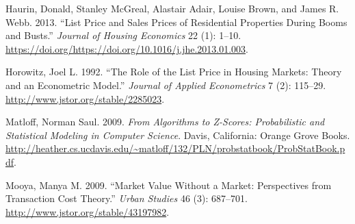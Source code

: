 \documentclass{article}
\begin{document}
\leavevmode\hypertarget{ref-haurin}{}%
Haurin, Donald, Stanley McGreal, Alastair Adair, Louise Brown, and James
R. Webb. 2013. ``List Price and Sales Prices of Residential Properties
During Booms and Busts.'' \emph{Journal of Housing Economics} 22 (1):
1--10. \url{https://doi.org/https://doi.org/10.1016/j.jhe.2013.01.003}.

\leavevmode\hypertarget{ref-horowitz}{}%
Horowitz, Joel L. 1992. ``The Role of the List Price in Housing Markets:
Theory and an Econometric Model.'' \emph{Journal of Applied
Econometrics} 7 (2): 115--29. \url{http://www.jstor.org/stable/2285023}.

\leavevmode\hypertarget{ref-matloff2009}{}%
Matloff, Norman Saul. 2009. \emph{From Algorithms to Z-Scores:
Probabilistic and Statistical Modeling in Computer Science}. Davis,
California: Orange Grove Books.
\url{http://heather.cs.ucdavis.edu/~matloff/132/PLN/probstatbook/ProbStatBook.pdf}.

\leavevmode\hypertarget{ref-mooya2009}{}%
Mooya, Manya M. 2009. ``Market Value Without a Market: Perspectives from
Transaction Cost Theory.'' \emph{Urban Studies} 46 (3): 687--701.
\url{http://www.jstor.org/stable/43197982}.



\end{document}
